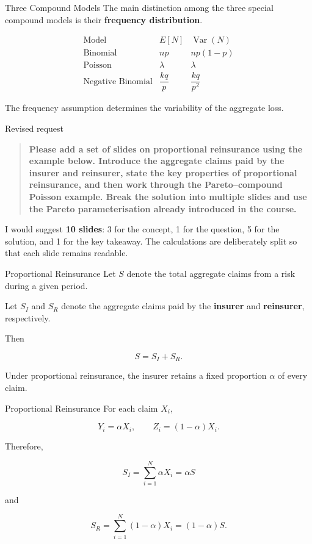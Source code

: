 \documentclass[
  ignorenonframetext,
  aspectratio=169,
]{beamer}
\begin{document}
\begin{frame}{Three Compound Models}
\protect{}\label{three-compound-models}
The main distinction among the three special compound models is their
\textbf{frequency distribution}.

\[
\begin{array}{c|c|c}
\text{Model} & E[N] & \operatorname{Var}(N)\\
\hline
\text{Binomial} & np & np(1-p)\\
\text{Poisson} & \lambda & \lambda\\
\text{Negative Binomial} & \dfrac{kq}{p} & \dfrac{kq}{p^2}
\end{array}
\]

The frequency assumption determines the variability of the aggregate
loss.
\end{frame}

\begin{frame}{Revised request}
\protect{}\label{revised-request}
\begin{quote}
\textbf{Please add a set of slides on proportional reinsurance using the
example below. Introduce the aggregate claims paid by the insurer and
reinsurer, state the key properties of proportional reinsurance, and
then work through the Pareto--compound Poisson example. Break the
solution into multiple slides and use the Pareto parameterisation
already introduced in the course.}
\end{quote}

I would suggest \textbf{10 slides}: 3 for the concept, 1 for the
question, 5 for the solution, and 1 for the key takeaway. The
calculations are deliberately split so that each slide remains readable.
\end{frame}

\begin{frame}{Proportional Reinsurance}
\protect{}\label{proportional-reinsurance}
Let \(S\) denote the total aggregate claims from a risk during a given
period.

Let \(S_I\) and \(S_R\) denote the aggregate claims paid by the
\textbf{insurer} and \textbf{reinsurer}, respectively.

Then

\[
\boxed{S=S_I+S_R}.
\]

Under proportional reinsurance, the insurer retains a fixed proportion
\(\alpha\) of every claim.
\end{frame}

\begin{frame}{Proportional Reinsurance}
\protect{}\label{proportional-reinsurance-1}
For each claim \(X_i\),

\[
Y_i=\alpha X_i,
\qquad
Z_i=(1-\alpha)X_i.
\]

Therefore,

\[
S_I=\sum_{i=1}^N\alpha X_i=\alpha S
\]

and

\[
S_R=\sum_{i=1}^N(1-\alpha)X_i=(1-\alpha)S.
\]
\end{frame}
\end{document}
